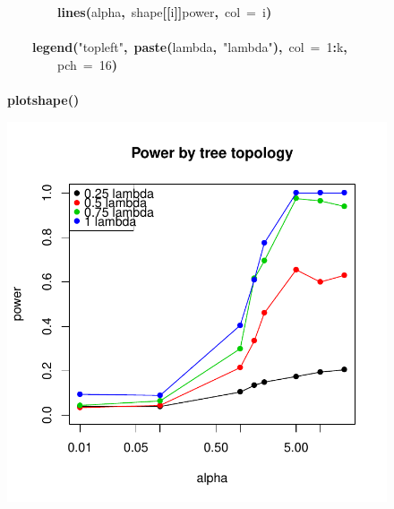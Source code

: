 \documentclass{elsarticle}
\makeatletter
\newcommand{\hlnumber}[1]{\textcolor[rgb]{0,0,0}{#1}}%
\newcommand{\hlfunctioncall}[1]{\textcolor[rgb]{.5,0,.33}{\textbf{#1}}}%
\newcommand{\hlstring}[1]{\textcolor[rgb]{.6,.6,1}{#1}}%
\newcommand{\hlkeyword}[1]{\textbf{#1}}%
\newcommand{\hlargument}[1]{\textcolor[rgb]{.69,.25,.02}{#1}}%
\newcommand{\hlsymbol}[1]{#1}%
\newcommand{\hlstd}[1]{\textcolor[rgb]{0,0,0}{#1}}%
\newenvironment{kframe}{%
 \def\FrameCommand##1{\hskip\@totalleftmargin \hskip-\fboxsep
 \colorbox{shadecolor}{##1}\hskip-\fboxsep
     \hskip-\linewidth \hskip-\@totalleftmargin \hskip\columnwidth}%
 \MakeFramed {\advance\hsize-\width
   \@totalleftmargin\z@ \linewidth\hsize
   \@setminipage}}%
 {\par\unskip\endMakeFramed}
\newenvironment{knitrout}{}{} %
\makeatother
\begin{document}
\begin{figure}
\begin{center}
\begin{knitrout}
{\begin{kframe}
\begin{flushleft}
\hlstd{}{\ }{\ }{\ }{\ }{\ }{\ }{\ }{\ }\hlfunctioncall{lines}\hlkeyword{(}\hlsymbol{alpha}\hlkeyword{,}{\ }\hlsymbol{shape}\hlkeyword{[[}\hlsymbol{i}\hlkeyword{]}\hlkeyword{]}\hlkeyword{\usebox{\hlnormalsizeboxdollar}}\hlsymbol{power}\hlkeyword{,}{\ }\hlargument{col}{\ }\hlargument{=}{\ }\hlsymbol{i}\hlkeyword{)}\hspace*{\fill}\\
\hlstd{}{\ }{\ }{\ }{\ }\hlkeyword{\usebox{\hlnormalsizeboxclosebrace}}\hspace*{\fill}\\
\hlstd{}{\ }{\ }{\ }{\ }\hlfunctioncall{legend}\hlkeyword{(}\hlstring{"{}topleft"{}}\hlkeyword{,}{\ }\hlfunctioncall{paste}\hlkeyword{(}\hlsymbol{lambda}\hlkeyword{,}{\ }\hlstring{"{}lambda"{}}\hlkeyword{)}\hlkeyword{,}{\ }\hlargument{col}{\ }\hlargument{=}{\ }\hlnumber{1}\hlkeyword{:}\hlsymbol{k}\hlkeyword{,}\hspace*{\fill}\\
\hlstd{}{\ }{\ }{\ }{\ }{\ }{\ }{\ }{\ }\hlargument{pch}{\ }\hlargument{=}{\ }\hlnumber{16}\hlkeyword{)}\hspace*{\fill}\\
\hlstd{}\hlkeyword{\usebox{\hlnormalsizeboxclosebrace}}\hspace*{\fill}\\
\hlstd{}\hlfunctioncall{plot\usebox{\hlnormalsizeboxunderscore}shape}\hlkeyword{(}\hlkeyword{)}\mbox{}
\normalfont
\end{flushleft}


\centering{}\includegraphics{Fig6b} 

\end{kframe}}
\end{knitrout}

\end{center}
\label{fig:sixb}
\end{figure}
\end{document}
